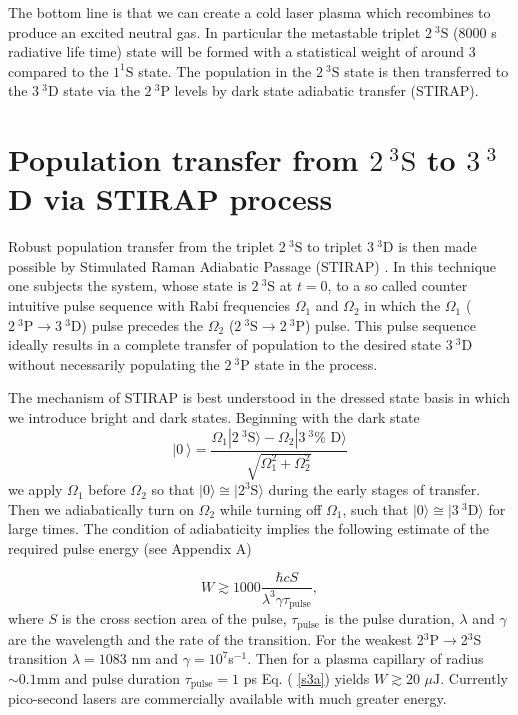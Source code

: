 \documentclass[preprint,preprintnumbers]{revtex4}
\begin{document}
The bottom line is that we can create a cold laser plasma which recombines
to produce an excited neutral gas. In particular the metastable triplet $%
2~^{3}\text{S}$ (8000 s radiative life time) state will be formed with a
statistical weight of around 3 compared to the $1^{1}\text{S}$ state. The
population in the $2~^{3}\text{S}$ state is then transferred to the $3~^{3}%
\text{D}$ state via the $2~^{3}\text{P}$ levels by dark state adiabatic
transfer (STIRAP).

\section{Population transfer from $2~^{3}\text{S}$ to $3~^{3}$D via STIRAP
process}

Robust population transfer from the triplet $2~^{3}\text{S}$ to triplet $%
3~^{3}\text{D}$ is then made possible by Stimulated Raman Adiabatic Passage
(STIRAP) \cite{Berg98}. In this technique one subjects the system, whose
state is $2~^{3}\text{S}$ at $t=0$, to a so called counter intuitive pulse
sequence with Rabi frequencies $\Omega _{1}$ and $\Omega _{2}$ in which the $%
\Omega _{1}$ ($2~^{3}\text{P}\rightarrow 3~^{3}\text{D}$) pulse precedes the
$\Omega _{2}$ ($2~^{3}\text{S}\rightarrow 2~^{3}\text{P}$) pulse. This pulse
sequence ideally results in a complete transfer of population to the desired
state $3~^{3}\text{D}$ without necessarily populating the $2~^{3}\text{P}$
state in the process.

The mechanism of STIRAP is best understood in the dressed state basis in
which we introduce bright and dark states. Beginning with the dark state
\begin{equation}
|0~\rangle =\frac{\Omega _{1}|2~^{3}\text{S}\rangle -\Omega _{2}|3~^{3}\text{%
D}\rangle }{\sqrt{\Omega _{1}^{2}+\Omega _{2}^{2}}}
\end{equation}%
we apply $\Omega _{1}$ before $\Omega _{2}$ so that $|0\rangle \cong |2^{3}%
\text{S}\rangle $ during the early stages of transfer. Then we adiabatically
turn on $\Omega _{2}$ while turning off $\Omega _{1}$, such that $|0\rangle
\cong |3~^{3}\text{D}\rangle $ for large times. The condition of
adiabaticity implies the following estimate of the required pulse energy
(see Appendix A)

\begin{equation}
W\gtrsim 1000\frac{\hbar cS}{\lambda ^{3}\gamma \tau _{\text{pulse}}},
\label{s3a}
\end{equation}%
where $S$ is the cross section area of the pulse, $\tau _{\text{pulse}}$ is
the pulse duration, $\lambda $ and $\gamma $ are the wavelength and the rate
of the transition. For the weakest 2$^{3}$P$\rightarrow $2$^{3}$S transition
$\lambda =1083$ nm and $\gamma =10^{7}$s$^{-1}$. Then for a plasma capillary
of radius $\sim 0.1$mm and pulse duration $\tau _{\text{pulse}}=1$ ps Eq. (%
\ref{s3a}) yields $W\gtrsim 20$ $\mu \text{J}$. Currently pico-second lasers
are commercially available with much greater energy.
\end{document}
